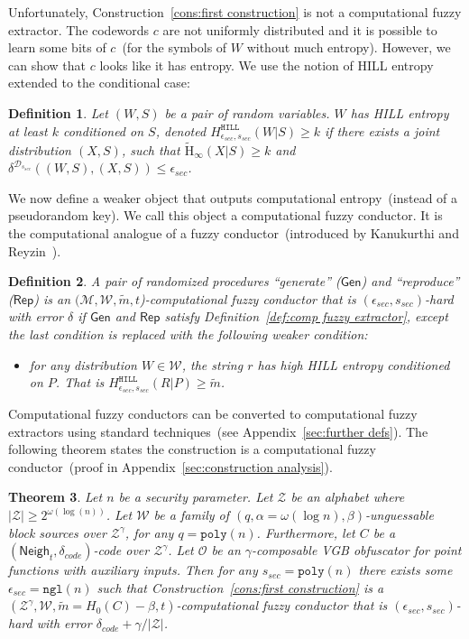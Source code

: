 \documentclass[11pt]{article}
\newcommand{\apref}[1]{\mbox{Appendix~\ref{#1}}}
\newcommand{\defref}[1]{\mbox{Definition~\ref{#1}}}
\newcommand{\consref}[1]{\mbox{Construction~\ref{#1}}}
\newcommand{\class}[1]{{\ensuremath{\mathsf{#1}}}}
\newcommand{\gen}{\ensuremath{\class{Gen}}\xspace}
\newcommand{\rep}{\ensuremath{\class{Rep}}\xspace}
\newcommand{\neigh}{\ensuremath{\class{Neigh}}\xspace}
\newcommand{\hill}{\ensuremath{\mathtt{HILL}}\xspace}
\newcommand{\poly}{\ensuremath{\mathtt{poly}}\xspace}
\newcommand{\ngl}{\ensuremath{\mathtt{ngl}}\xspace}
\newcommand{\Hav}{\tilde{\mathrm{H}}_\infty}
\newtheorem{theorem}{Theorem}[section]
\newtheorem{definition}[theorem]{Definition}
\begin{document}
Unfortunately, \consref{cons:first construction} is not a computational fuzzy extractor.  The codewords $c$ are not uniformly distributed and it is possible to learn some bits of $c$~(for the symbols of $W$ without much entropy).  However, we can show that $c$ looks like it has entropy.  We use the notion of HILL entropy~\cite{DBLP:journals/siamcomp/HastadILL99} extended to the conditional case:
\begin{definition}
\label{def:hill ent}
Let $(W, S)$ be a pair of random variables.  $W$ has
\emph{HILL entropy} at least $k$ conditioned on $S$,
denoted $H^{\hill}_{\epsilon_{sec}, s_{sec}}(W|S)\geq k$ if there exists a joint distribution $(X, S)$, such that $\Hav(X|S)\geq k$ and $\delta^{\mathcal{D}_{s_{sec}}} ((W, S),(X,S))\leq \epsilon_{sec}$.
\end{definition}
We now define a weaker object that outputs computational entropy~(instead of a pseudorandom key).  We call this object a computational fuzzy conductor.  It is the computational analogue of a fuzzy conductor~(introduced by Kanukurthi and Reyzin~\cite{KanukurthiR09}).
\begin{definition}
\label{def:comp fuzzy cond}
A pair of randomized procedures ``generate'' ($\gen$) and ``reproduce'' ($\rep$) is an $(\mathcal{M}, \mathcal{W}, \tilde{m}, t$)-computational fuzzy conductor that is $(\epsilon_{sec}, s_{sec})$-hard with error $\delta$ if $\gen$ and $\rep$ satisfy \defref{def:comp fuzzy extractor}, except the last condition is replaced with the following weaker condition:
\begin{itemize}
\item for any distribution $W\in \mathcal{W}$, the string $r$ has high HILL entropy conditioned on $P$.  That is $H^{\hill}_{\epsilon_{sec}, s_{sec}}(R |P)\geq \tilde{m}$.
\end{itemize}
\end{definition}
Computational fuzzy conductors can be converted to computational fuzzy extractors using standard techniques~(see \apref{sec:further defs}).
The following theorem states the construction is a computational fuzzy conductor~(proof in \apref{sec:construction analysis}).
\begin{theorem}
\label{thm:main thm first cons}
Let $n$ be a security parameter. Let $\mathcal{Z}$ be an alphabet where $|\mathcal{Z}| \ge 2^{ \omega(\log(n))}$.
Let $\mathcal{W}$ be a family of $(q,\alpha= \omega(\log n),  \beta)$-unguessable block sources over $\mathcal{Z}^\gamma$, for any $q = \poly(n)$.  Furthermore, let $C$ be a $(\neigh_t, \delta_{code})$-code over $\mathcal{Z}^\gamma$.  Let $\mathcal{O}$ be an $\gamma$-composable VGB obfuscator for point functions with auxiliary inputs. Then for any $s_{sec} = \poly(n)$ there exists some $\epsilon_{sec}=\ngl(n)$ such that \consref{cons:first construction} is a $(\mathcal{Z}^\gamma, \mathcal{W}, \tilde{m}=H_0(C)-\beta, t)$-computational fuzzy conductor that is $(\epsilon_{sec}, s_{sec})$-hard with error $\delta_{code} + \gamma/|\mathcal{Z}|$.
\end{theorem}
\end{document}
